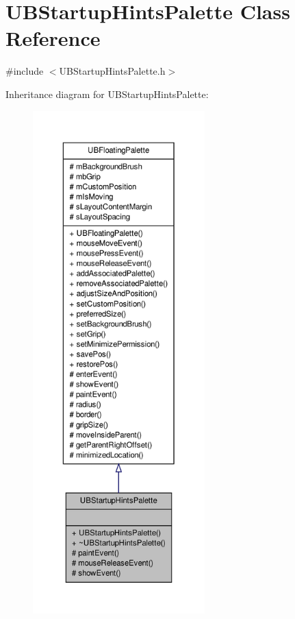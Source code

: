 \hypertarget{class_u_b_startup_hints_palette}{\section{U\-B\-Startup\-Hints\-Palette Class Reference}
\label{d0/d25/class_u_b_startup_hints_palette}
}


{\ttfamily \#include $<$U\-B\-Startup\-Hints\-Palette.\-h$>$}



Inheritance diagram for U\-B\-Startup\-Hints\-Palette\-:
\nopagebreak
\begin{figure}[H]
\begin{center}
\leavevmode
\includegraphics[height=550pt]{d2/d94/class_u_b_startup_hints_palette__inherit__graph}
\end{center}
\end{figure}


